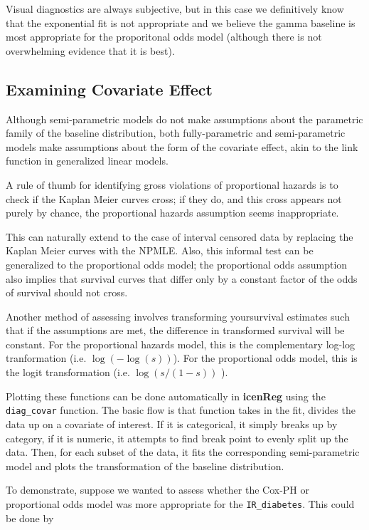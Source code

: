 \documentclass[a4paper]{article}
\begin{document}
Visual diagnostics are always subjective, but in this case we definitively know that the exponential fit is not appropriate and we believe the gamma baseline is most appropriate for the proporitonal odds model (although there is not overwhelming evidence that it is best). 
  
\subsection{Examining Covariate Effect}
  
Although semi-parametric models do not make assumptions about the parametric family of the baseline distribution, both fully-parametric and semi-parametric models make assumptions about the form of the covariate effect, akin to the link function in generalized linear models. 
  
A rule of thumb for identifying gross violations of proportional hazards is to check if the Kaplan Meier curves cross; if they do, and this cross appears not purely by chance, the proportional hazards assumption seems inappropriate. 
  
This can naturally extend to the case of interval censored data by replacing the Kaplan Meier curves with the NPMLE. Also, this informal test can be generalized to the proportional odds model; the proportional odds assumption also implies that survival curves that differ only by a constant factor of the odds of survival should not cross. 
  
Another method of assessing involves transforming yoursurvival estimates such that if the assumptions are met, the difference in transformed survival will be constant. For the proportional hazards model, this is the complementary log-log tranformation (i.e. $\log (-\log(s) )$). For the proportional odds model, this is the logit transformation (i.e. $\log(s/(1-s))$ ).
  
Plotting these functions can be done automatically in {\bf icenReg} using the \texttt{diag\_covar} function. The basic flow is that function takes in the fit, divides the data up on a covariate of interest. If it is categorical, it simply breaks up by category, if it is numeric, it attempts to find break point to evenly split up the data. Then, for each subset of the data, it fits the corresponding semi-parametric model and plots the transformation of the baseline distribution. 
 
To demonstrate, suppose we wanted to assess whether the Cox-PH or proportional odds model was more appropriate for the \texttt{IR\_diabetes}. This could be done by 
 
\end{document}
